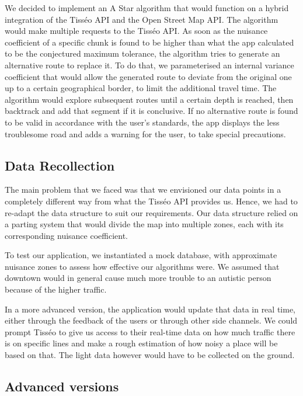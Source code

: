 We decided to implement an A Star algorithm that would function on a hybrid integration of the Tisséo API and the Open Street Map API. The algorithm would make multiple requests to the Tisséo API. As soon as the nuisance coefficient of a specific chunk is found to be higher than what the app calculated to be the conjectured maximum tolerance, the algorithm tries to generate an alternative route to replace it. To do that, we parameterised an internal variance coefficient that would allow the generated route to deviate from the original one up to a certain geographical border, to limit the additional travel time. The algorithm would explore subsequent routes until a certain depth is reached, then backtrack and add that segment if it is conclusive. If no alternative route is found to be valid in accordance with the user's standards, the app displays the less troublesome road and adds a warning for the user, to take special precautions.

\newpage
\subsection{Data Recollection}

The main problem that we faced was that we envisioned our data points in a completely different way from what the Tisséo API provides us. Hence, we had to re-adapt the data structure to suit our requirements. Our data structure relied on a parting system that would divide the map into multiple zones, each with its corresponding nuisance coefficient.
\newline

To test our application, we instantiated a mock database, with approximate nuisance zones to assess how effective our algorithms were. We assumed that downtown would in general cause much more trouble to an autistic person because of the higher traffic.
\newline

In a more advanced version, the application would update that data in real time, either through the feedback of the users or through other side channels. We could prompt Tisséo to give us access to their real-time data on how much traffic there is on specific lines and make a rough estimation of how noisy a place will be based on that. The light data however would have to be collected on the ground.
\newline

\subsection{Advanced versions}

